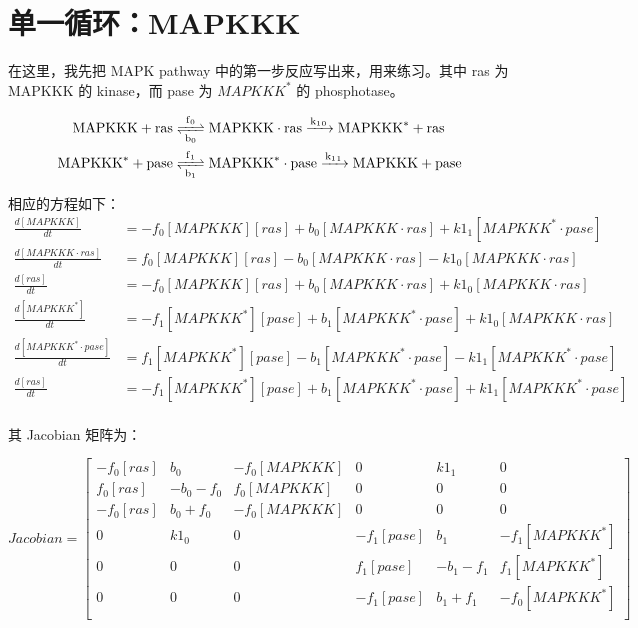 \section{单一循环：MAPKKK}
在这里，我先把 MAPK pathway 中的第一步反应写出来，用来练习。其中 ras 为 MAPKKK 的 kinase，而 pase 为 $MAPKKK^{*}$ 的 phosphotase。

\begin{align*}
  \ce{MAPKKK + ras &<=>[f_{0}][b_{0}] MAPKKK\cdot{}ras ->[k1_{0}] MAPKKK^{*} + ras\\
    MAPKKK^{*} + pase &<=>[f_{1}][b_{1}] MAPKKK^{*}\cdot{}pase ->[k1_{1}] MAPKKK + pase}
\end{align*}

相应的方程如下：
\small
\begin{equation*}
  \begin{align*}
    \frac{d[MAPKKK]}{dt} &= -f_{0}[MAPKKK][ras] + b_{0}[MAPKKK\cdot{}ras] + k1_{1}[MAPKKK^{*}\cdot{}pase]\\
    \frac{d[MAPKKK\cdot{}ras]}{dt} &= f_{0}[MAPKKK][ras] - b_{0}[MAPKKK\cdot{}ras] - k1_{0}[MAPKKK\cdot{}ras]\\
    \frac{d[ras]}{dt} &= -f_{0}[MAPKKK][ras] + b_{0}[MAPKKK \cdot{}ras] + k1_{0}[MAPKKK\cdot{}ras]\\
    \frac{d[MAPKKK^{*}]}{dt} &= -f_{1}[MAPKKK^{*}][pase] + b_{1}[MAPKKK^{*}\cdot{}pase] + k1_{0}[MAPKKK\cdot{}ras]\\
    \frac{d[MAPKKK^{*}\cdot{}pase]}{dt} &= f_{1}[MAPKKK^{*}][pase] - b_{1}[MAPKKK^{*}\cdot{}pase] - k1_{1}[MAPKKK^{*}\cdot{}pase]\\
    \frac{d[ras]}{dt} &= -f_{1}[MAPKKK^{*}][pase] + b_{1}[MAPKKK^{*}\cdot{}pase] + k1_{1}[MAPKKK^{*}\cdot{}pase]\\
  \end{align*}
\end{equation*}
\normalsize

其 Jacobian 矩阵为：

\small
\begin{displaymath}
  Jacobian =
  \left[
    \begin{array}{cccccc}
      -f_{0}[ras] & b_{0} & -f_{0}[MAPKKK] & 0 & k1_{1} & 0 \\
      f_{0}[ras] & -b_{0} - f_{0} & f_{0}[MAPKKK] & 0 & 0 & 0 \\
      -f_{0}[ras] & b_{0} + f_{0} & -f_{0}[MAPKKK] & 0 & 0 & 0 \\
      0 & k1_{0} & 0 & -f_{1}[pase] & b_{1} & -f_{1}[MAPKKK^{*}] \\
      0 & 0 & 0 & f_{1}[pase] & -b_{1} - f_{1} & f_{1}[MAPKKK^{*}] \\
      0 & 0 & 0 & -f_{1}[pase] & b_{1} + f_{1} & -f_{0}[MAPKKK^{*}] \\
    \end{array}
  \right]
\end{displaymath}
\normalsize
